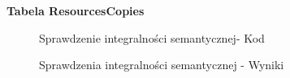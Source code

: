 \textbf{Tabela ResourcesCopies}
\begin{figure}[H]
    \centering
    \caption{Sprawdzenie integralności semantycznej- Kod}
\end{figure}
\begin{figure}[H]
    \centering
    \caption{Sprawdzenia integralności semantycznej - Wyniki}
\end{figure}
